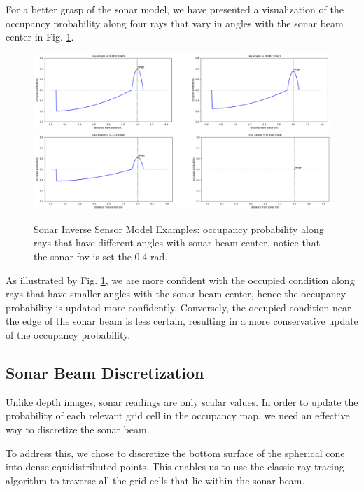 For a better grasp of the sonar model, we have presented a visualization of the occupancy probability along four rays that vary in angles with the sonar beam center in Fig. \ref{fig:sim_sonar_plot}.
\begin{figure}[h]
    \centering
    \includegraphics[width=1.0\columnwidth]{fig/sonar_model_1.png}
    \includegraphics[width=1.0\columnwidth]{fig/sonar_model_2.png}
    \caption{Sonar Inverse Sensor Model Examples: occupancy probability along rays that have different angles with sonar beam center, notice that the sonar \gls{fov} is set the 0.4 rad.}
    \label{fig:sim_sonar_plot}
\end{figure}

As illustrated by Fig. \ref{fig:sim_sonar_plot}, we are more confident with the occupied condition along rays that have smaller angles with the sonar beam center, hence the occupancy probability is updated more confidently. Conversely, the occupied condition near the edge of the sonar beam is less certain, resulting in a more conservative update of the occupancy probability.

\subsection{Sonar Beam Discretization}
\label{sec:method_dis}
Unlike depth images, sonar readings are only scalar values. In order to update the probability of each relevant grid cell in the occupancy map, we need an effective way to discretize the sonar beam.

To address this, we chose to discretize the bottom surface of the spherical cone into dense equidistributed points. This enables us to use the classic ray tracing algorithm \cite{raytracing} to traverse all the grid cells that lie within the sonar beam.

